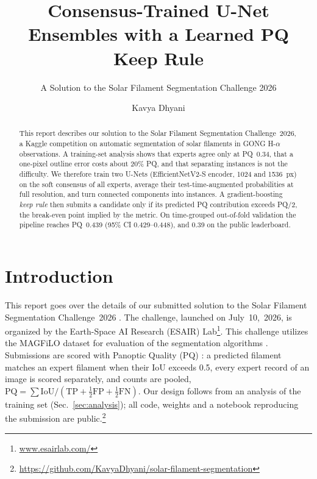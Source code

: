 \documentclass[sigconf]{acmart}
\begin{document}
\title{Consensus-Trained U-Net Ensembles with a Learned PQ Keep Rule}
\subtitle{A Solution to the Solar Filament Segmentation Challenge 2026} %


\author{Kavya Dhyani}

\begin{abstract}
    This report describes our solution to the Solar Filament Segmentation Challenge~2026, a Kaggle competition on automatic segmentation of solar filaments in GONG H-$\alpha$ observations. A training-set analysis shows that experts agree only at PQ~0.34, that a one-pixel outline error costs about 20\% PQ, and that separating instances is not the difficulty. We therefore train two U-Nets (EfficientNetV2-S encoder, 1024 and 1536~px) on the soft consensus of all experts, average their test-time-augmented probabilities at full resolution, and turn connected components into instances. A gradient-boosting \emph{keep rule} then submits a candidate only if its predicted PQ contribution exceeds PQ/2, the break-even point implied by the metric. On time-grouped out-of-fold validation the pipeline reaches PQ~0.439 (95\% CI 0.429--0.448), and 0.39 on the public leaderboard.
\end{abstract}

\maketitle


\section{Introduction}
    This report goes over the details of our submitted solution to the Solar Filament Segmentation Challenge~2026 \cite{filament-segmentation-2026}. The challenge, launched on July~10,~2026, is organized by the Earth-Space AI Research (ESAIR) Lab\footnote{\href{https://www.esairlab.com/home}{www.esairlab.com/}}. This challenge utilizes the MAGFiLO dataset for evaluation of the segmentation algorithms \cite{ahmadzadeh2024dataset}. Submissions are scored with Panoptic Quality (PQ) \cite{kirillov2019panoptic}: a predicted filament matches an expert filament when their IoU exceeds 0.5, every expert record of an image is scored separately, and counts are pooled, $\mathrm{PQ}=\sum \mathrm{IoU}/(\mathrm{TP}+\tfrac12\mathrm{FP}+\tfrac12\mathrm{FN})$. Our design follows from an analysis of the training set (Sec.~\ref{sec:analysis}); all code, weights and a notebook reproducing the submission are public.\footnote{\url{https://github.com/KavyaDhyani/solar-filament-segmentation}}
\end{document}
